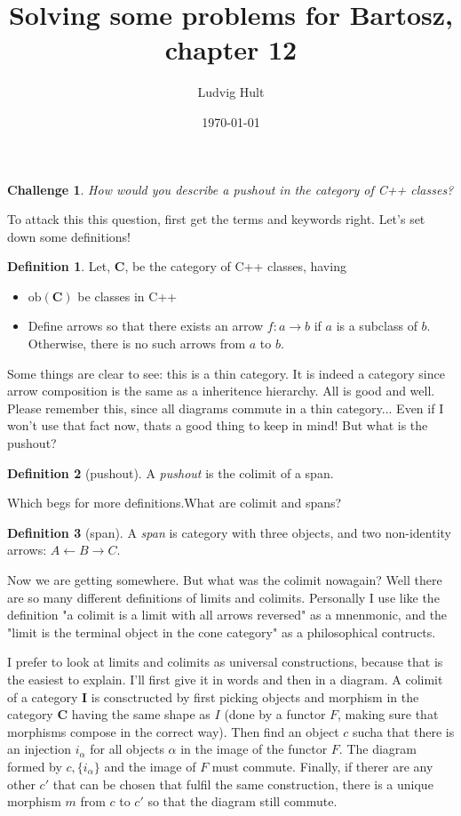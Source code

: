 \documentclass{article}
\title{Solving some problems for Bartosz, chapter 12}
\author{Ludvig Hult}
\date\today
\newcommand {\cat}{%
\mathbf%
}
\newcommand{\ob}[1]{\mathrm{ob}(#1)}
\theoremstyle{definition}
\newtheorem{ch}{Challenge}
\newtheorem{defn}{Definition}[ch]
\begin{document}
 
\maketitle

\begin{ch}
\textit{How would you describe a pushout in the category of C++ classes?}

To attack this this question, first get the terms and keywords right. Let's set down some definitions!

\begin{defn}
Let, $\cat C$, be the category of C++ classes, having
\begin{itemize}
\item $\ob{\cat C}$ be classes in C++
\item Define arrows so that there exists an arrow $f:a\to b$ if $a$ is a subclass of $b$. Otherwise, there is no such arrows from $a$ to $b$.
\end{itemize}
\end{defn}

Some things are clear to see: this is a thin category. It is indeed a category since arrow composition is the same as a inheritence hierarchy. All is good and well. Please remember this, since all diagrams commute in a thin category... Even if I won't use that fact now, thats a good thing to keep in mind! But what is the pushout?

\begin{defn}[pushout]
	A \emph{pushout} is the colimit of a span.
\end{defn}

Which begs for more definitions.What are colimit and spans?

\begin{defn}[span]
	A \emph{span} is category with three objects, and two non-identity arrows: $A \leftarrow B \rightarrow C$.
\end{defn}

Now we are getting somewhere. But what was the colimit nowagain? Well there are so many different definitions of limits and colimits. Personally I use like the definition "a colimit is a limit with all arrows reversed" as a mnenmonic, and the "limit is the terminal object in the cone category" as a philosophical contructs.


I prefer to look at limits and colimits as universal constructions, because that is the easiest to explain. I'll first give it in words and then in a diagram. A colimit of a category $\cat I$ is consctructed by first picking objects and morphism in the category $\cat C$ having the same shape as $I$ (done by a functor $F$, making sure that morphisms compose in the correct way). Then find an object $c$ sucha that there is an injection $i_\alpha$ for all objects $\alpha$ in the image of the functor $F$. The diagram formed by $c, \{i_\alpha\}$ and the image of $F$ must commute. Finally, if therer are any other $c'$ that can be chosen that fulfil the same construction, there is a unique morphism $m$ from $c$ to $c'$ so that the diagram still commute.


\end{ch}
\end{document}
